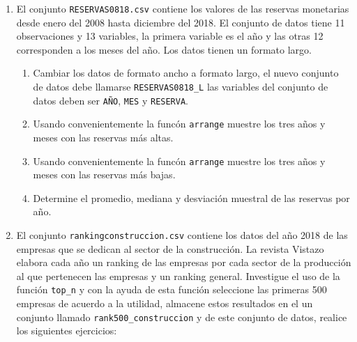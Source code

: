 \documentclass[
]{krantz}
\providecommand{\tightlist}{%
  \setlength{\itemsep}{0pt}\setlength{\parskip}{0pt}}
\begin{document}
\begin{enumerate}
\def\labelenumi{\arabic{enumi}.}
\item
  El conjunto \texttt{RESERVAS0818.csv} contiene los valores de las reservas monetarias desde enero del 2008 hasta diciembre del 2018. El conjunto de datos tiene 11 observaciones y 13 variables, la primera variable es el año y las otras 12 corresponden a los meses del año. Los datos tienen un formato largo.

  \begin{enumerate}
  \def\labelenumii{\alph{enumii}.}
  \tightlist
  \item
    Cambiar los datos de formato ancho a formato largo, el nuevo conjunto de datos debe llamarse \texttt{RESERVAS0818\_L} las variables del conjunto de datos deben ser \texttt{AÑO}, \texttt{MES} y \texttt{RESERVA}.
  \item
    Usando convenientemente la funcón \texttt{arrange} muestre los tres años y meses con las reservas más altas.
  \item
    Usando convenientemente la funcón \texttt{arrange} muestre los tres años y meses con las reservas más bajas.
  \item
    Determine el promedio, mediana y desviación muestral de las reservas por año.
  \end{enumerate}
\item
  El conjunto \texttt{rankingconstruccion.csv} contiene los datos del año 2018 de las empresas que se dedican al sector de la construcción. La revista Vistazo elabora cada año un ranking de las empresas por cada sector de la producción al que pertenecen las empresas y un ranking general. Investigue el uso de la función \texttt{top\_n} y con la ayuda de esta función seleccione las primeras 500 empresas de acuerdo a la utilidad, almacene estos resultados en el un conjunto llamado \texttt{rank500\_construccion} y de este conjunto de datos, realice los siguientes ejercicios:


\end{enumerate}
\end{document}
